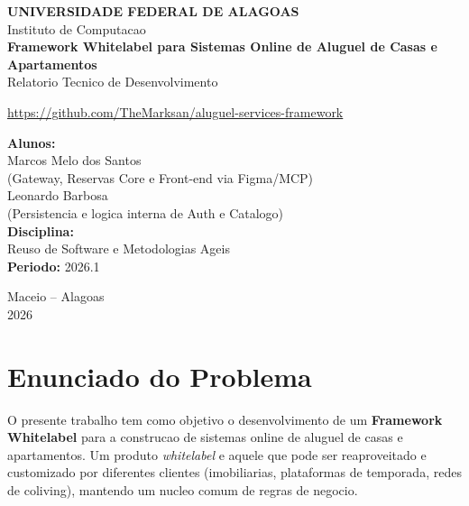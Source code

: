 \documentclass[12pt,a4paper]{article}
\begin{document}
\begin{titlepage}
    \centering
    \vspace*{1cm}
    {\Large \textbf{UNIVERSIDADE FEDERAL DE ALAGOAS}}\\[0.3cm]
    {\large Instituto de Computacao}\\[2.5cm]

    {\Huge \textbf{Framework Whitelabel para Sistemas Online de Aluguel de Casas e Apartamentos}}\\[0.5cm]
    {\large Relatorio Tecnico de Desenvolvimento}\\[0.5cm]
    \begin{center}
        \url{https://github.com/TheMarksan/aluguel-services-framework}
    \end{center}
    \vspace{3cm}

    \begin{flushright}
        \begin{minipage}{0.6\textwidth}
            \textbf{Alunos:}\\
            Marcos Melo dos Santos\\
            {\small (Gateway, Reservas Core e Front-end via Figma/MCP)}\\
            Leonardo Barbosa\\
            {\small (Persistencia e logica interna de Auth e Catalogo)}\\[1cm]
            \textbf{Disciplina:}\\
            Reuso de Software e Metodologias Ageis\\[1cm]
            \textbf{Periodo:} 2026.1
        \end{minipage}
    \end{flushright}

    \vfill
    {\large Maceio -- Alagoas\\ 2026}
\end{titlepage}

\tableofcontents
\newpage

\section{Enunciado do Problema}
O presente trabalho tem como objetivo o desenvolvimento de um \textbf{Framework
Whitelabel} para a construcao de sistemas online de aluguel de casas e apartamentos.
Um produto \textit{whitelabel} e aquele que pode ser reaproveitado e customizado por
diferentes clientes (imobiliarias, plataformas de temporada, redes de coliving),
mantendo um nucleo comum de regras de negocio.
\end{document}
